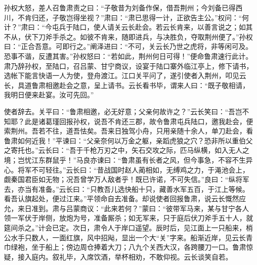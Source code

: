 孙权大怒，差人召鲁肃责之曰：“子敬昔为刘备作保，借吾荆州；今刘备已得西川，不肯归还，子敬岂得坐视？”肃曰：“肃已思得一计，正欲告主公。”权问：“何计？”肃曰：“今屯兵于陆口，使人请关云长赴会。若云长肯来，以善言说之；如其不从，伏下刀斧手杀之。如彼不肯来，随即进兵，与决胜负，夺取荆州便了。”孙权曰：“正合吾意。可即行之。”阐泽进曰：“不可，关云长乃世之虎将，非等闲可及。恐事不谐，反遭其害。”孙权怒曰：“若如此，荆州何日可得！”便命鲁肃速行此计。肃乃辞孙权，至陆口，召吕蒙、甘宁商议，设宴于陆口寨外临江亭上，修下请书，选帐下能言快语一人为使，登舟渡江。江口关平问了，遂引使者入荆州，叩见云长，具道鲁肃相邀赴会之意，呈上请书。云长看书毕，谓来人曰：“既子敬相请，我明日便来赴宴。汝可先回。”

使者辞去。关平曰：“鲁肃相邀，必无好意；父亲何故许之？”云长笑曰：“吾岂不知耶？此是诸葛瑾回报孙权，说吾不肯还三郡，故令鲁肃屯兵陆口，邀我赴会，便索荆州。吾若不往，道吾怯矣。吾来日独驾小舟，只用亲随十余人，单刀赴会，看鲁肃如何近我！”平谏曰：“父亲奈何以万金之躯，亲蹈虎狼之穴？恐非所以重伯父之寄托也。”云长曰：“吾于千枪万刃之中，矢石交攻之际，匹马纵横，如入无人之境；岂忧江东群鼠乎！”马良亦谏曰：“鲁肃虽有长者之风，但今事急，不容不生异心。将军不可轻往。”云长曰：“昔战国时赵人蔺相如，无缚鸡之力，于渑池会上，觑秦国君臣如无物；况吾曾学万人敌者乎！既已许诺，不可失信。”良曰：“纵将军去，亦当有准备。”云长曰：“只教吾儿选快船十只，藏善水军五百，于江上等候。看吾认旗起处，便过江来。”平领命自去准备。却说使者回报鲁肃，说云长慨然应允，来日准到。肃与吕蒙商议：“此来若何？”蒙曰：“彼带军马来，某与甘宁各人领一军伏于岸侧，放炮为号，准备厮杀；如无军来，只于庭后伏刀斧手五十人，就筵间杀之。”计会已定。次日，肃令人于岸口遥望。辰时后，见江面上一只船来，梢公水手只数人，一面红旗，风中招飐，显出一个大“关”字来。船渐近岸，见云长青巾绿袍，坐于船上；傍边周仓捧着大刀；八九个关西大汉，各跨腰刀一口。鲁肃惊疑，接入庭内。叙礼毕，入席饮酒，举杯相劝，不敢仰视。云长谈笑自若。

